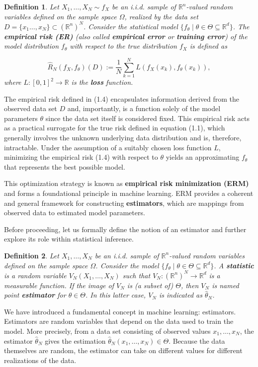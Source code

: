 \documentclass{report}
\newtheorem{definition}{Definition}[chapter]
\begin{document}
\begin{definition}
Let $X_1,\dots,X_N \sim f_X$ be an i.i.d. sample of $\mathbb{R}^n$-valued random variables defined on the sample space $\Omega$, realized by the data set $D = \{x_1\dots,x_N\} \subset (\mathbb{R}^n)^N$. Consider the statistical model $\{f_\theta \mid \theta \in \Theta \subseteq \mathbb{R}^d\}$. The \textbf{empirical risk (ER)} (also called \textbf{empirical error} or \textbf{training error}) of the model distribution $f_\theta$ with respect to the true distribution $f_X$ is defined as

\begin{equation}
\hat{R}_N(f_X,f_\theta)(D) := \frac{1}{N}\sum_{k=1}^{N}L(f_X(x_k),f_\theta(x_k)),
\end{equation}
where $L : [0,1]^2 \to \mathbb{R}$ is the \textbf{loss} function.
\end{definition}
The empirical risk defined in (1.4) encapsulates information derived from the observed data set $D$ and, importantly, is a function solely of the model parameters $\theta$ since the data set itself is considered fixed. This empirical risk acts as a practical surrogate for the true risk defined in equation (1.1), which generally involves the unknown underlying data distribution and is, therefore, intractable. Under the assumption of a suitably chosen loss function $L$, minimizing the empirical risk (1.4) with respect to $\theta$ yields an approximating $f_\theta$ that represents the best possible model.

This optimization strategy is known as \textbf{empirical risk minimization (ERM)} and forms a foundational principle in machine learning. ERM provides a coherent and general framework for constructing \textbf{estimators}, which are mappings from observed data to estimated model parameters.

Before proceeding, let us formally define the notion of an estimator and further explore its role within statistical inference.

\begin{definition}
Let $X_1,\dots,X_N$ be an i.i.d. sample of $\mathbb{R}^n$-valued random variables defined on the sample space $\Omega$. Consider the model $\{f_\theta \mid \theta \in \Theta \subseteq \mathbb{R}^d \}$. A \textbf{statistic} is a random variable $V_N(X_1,\dots,X_N)$ such that $V_N : (\mathbb{R}^n)^N \to \mathbb{R}^d$ is a measurable function. If the image of $V_N$ is (a subset of) $\Theta$, then $V_N$ is named point \textbf{estimator} for $\theta \in \Theta$. In this latter case, $V_N$ is indicated as $\hat{\theta}_N$.
\end{definition}
We have introduced a fundamental concept in machine learning: estimators. Estimators are random variables that depend on the data used to train the model. More precisely, from a data set consisting of observed values $x_1,\dots,x_N$, the estimator $\hat{\theta}_N$ gives the estimation $\hat{\theta}_N(x_1,\dots,x_N) \in \Theta$. Because the data themselves are random, the estimator can take on different values for different realizations of the data.
\end{document}
